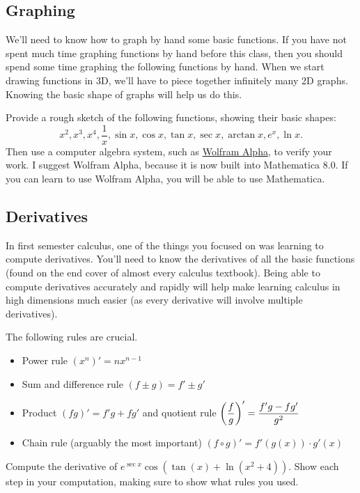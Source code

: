 \subsection{Graphing}
We'll need to know how to graph by hand some basic functions. If you have not spent much time graphing functions by hand before this class, then you should spend some time graphing the following functions by hand. When we start drawing functions in 3D, we'll have to piece together infinitely many 2D graphs.  Knowing the basic shape of graphs will help us do this.
\begin{problem}
Provide a rough sketch of the following functions, showing their basic shapes:
$$\displaystyle x^2, x^3, x^4, \frac{1}{x}, \sin x, \cos x, \tan x, \sec x, \arctan x, e^x,\ln x.$$ 
Then use a computer algebra system, such as \href{http://http://www.wolframalpha.com/}{Wolfram Alpha}, to verify your work. I suggest Wolfram Alpha, because it is now built into Mathematica 8.0.  If you can learn to use Wolfram Alpha, you will be able to use Mathematica.
\end{problem}


\subsection{Derivatives}
In first semester calculus, one of the things you focused on was learning to compute derivatives. You'll need to know the derivatives of all the basic functions (found on the end cover of almost every calculus textbook). Being able to compute derivatives accurately and rapidly will help make learning calculus in high dimensions much easier (as every derivative will involve multiple derivatives).

The following rules are crucial.
\begin{itemize}
\item Power rule {$(x^n)' = nx^{n-1}$}
\item Sum and difference rule {$(f\pm g) = f'\pm g'$}
\item Product {$(fg)' = f' g + fg'$} and quotient rule  {$\displaystyle\left(\frac f g\right)' = \frac{f' g - fg'}{g^2}$}
\item Chain rule (arguably the most important) {$(f\circ g)' = f'(g(x))\cdot g'(x)$}
\end{itemize}

\begin{problem}
Compute the derivative of $e^{\sec x}\cos(\tan(x)+\ln(x^2+4))$. Show each step in your computation, making sure to show what rules you used. 
\end{problem}

